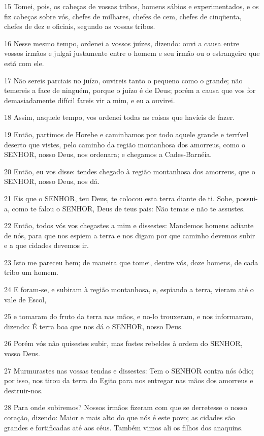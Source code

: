 \par 15 Tomei, pois, os cabeças de vossas tribos, homens sábios e experimentados, e os fiz cabeças sobre vós, chefes de milhares, chefes de cem, chefes de cinqüenta, chefes de dez e oficiais, segundo as vossas tribos.
\par 16 Nesse mesmo tempo, ordenei a vossos juízes, dizendo: ouvi a causa entre vossos irmãos e julgai justamente entre o homem e seu irmão ou o estrangeiro que está com ele.
\par 17 Não sereis parciais no juízo, ouvireis tanto o pequeno como o grande; não temereis a face de ninguém, porque o juízo é de Deus; porém a causa que vos for demasiadamente difícil fareis vir a mim, e eu a ouvirei.
\par 18 Assim, naquele tempo, vos ordenei todas as coisas que havíeis de fazer.
\par 19 Então, partimos de Horebe e caminhamos por todo aquele grande e terrível deserto que vistes, pelo caminho da região montanhosa dos amorreus, como o SENHOR, nosso Deus, nos ordenara; e chegamos a Cades-Barnéia.
\par 20 Então, eu vos disse: tendes chegado à região montanhosa dos amorreus, que o SENHOR, nosso Deus, nos dá.
\par 21 Eis que o SENHOR, teu Deus, te colocou esta terra diante de ti. Sobe, possui-a, como te falou o SENHOR, Deus de teus pais: Não temas e não te assustes.
\par 22 Então, todos vós vos chegastes a mim e dissestes: Mandemos homens adiante de nós, para que nos espiem a terra e nos digam por que caminho devemos subir e a que cidades devemos ir.
\par 23 Isto me pareceu bem; de maneira que tomei, dentre vós, doze homens, de cada tribo um homem.
\par 24 E foram-se, e subiram à região montanhosa, e, espiando a terra, vieram até o vale de Escol,
\par 25 e tomaram do fruto da terra nas mãos, e no-lo trouxeram, e nos informaram, dizendo: É terra boa que nos dá o SENHOR, nosso Deus.
\par 26 Porém vós não quisestes subir, mas fostes rebeldes à ordem do SENHOR, vosso Deus.
\par 27 Murmurastes nas vossas tendas e dissestes: Tem o SENHOR contra nós ódio; por isso, nos tirou da terra do Egito para nos entregar nas mãos dos amorreus e destruir-nos.
\par 28 Para onde subiremos? Nossos irmãos fizeram com que se derretesse o nosso coração, dizendo: Maior e mais alto do que nós é este povo; as cidades são grandes e fortificadas até aos céus. Também vimos ali os filhos dos anaquins.
